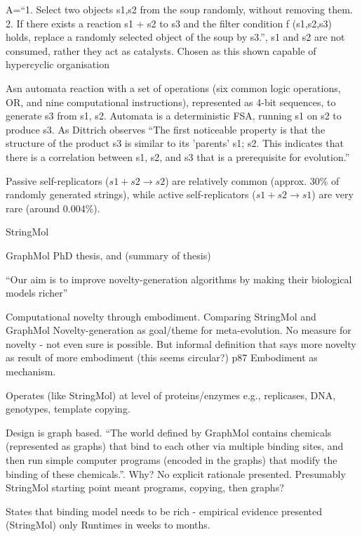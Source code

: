 A=``1. Select two objects s1,s2 from the soup randomly, without removing them. 2. If there exists a reaction s1 + s2 to s3 and the filter condition f (s1,s2,s3) holds, replace a randomly selected object of the soup by s3.'', s1 and s2 are not consumed, rather they act as catalysts. Chosen as this shown capable of hypercyclic organisation

Asn automata reaction with a set of operations (six common logic operations, \eg OR, and nine computational instructions), represented as 4-bit sequences, to generate s3 from s1, s2. Automata is a deterministic FSA, running s1 on s2 to produce s3. As Dittrich observes ``The first noticeable property is that the structure of the product s3 is similar to its 'parents' s1; s2. This indicates that there is a correlation between s1, s2, and s3 that is a prerequisite for evolution.''

Passive self-replicators ($s1 + s2 \rightarrow s2$) are relatively common (approx. 30\% of randomly generated strings), while active self-replicators ($s1 + s2 \rightarrow s1$) are very rare (around 0.004\%).

StringMol \parencite{Hickinbotham2011}



GraphMol \parencite{Nellis2012} PhD thesis, and \parencite{Nellis2014} (summary of thesis)

``Our aim is to improve novelty-generation algorithms by making their biological models richer''

Computational novelty through embodiment. Comparing StringMol and GraphMol
Novelty-generation as goal/theme for meta-evolution. No measure for novelty - not even sure is possible. But informal definition that says more novelty as result of more embodiment (this seems circular?) p87 Embodiment as mechanism. 

Operates (like StringMol) at level of proteins/enzymes e.g., replicases, DNA, genotypes, template copying.

Design is graph based. ``The world defined by GraphMol contains chemicals (represented as graphs) that bind to each other via multiple binding sites, and then run simple computer programs (encoded in the graphs) that modify the binding of these chemicals.''. Why? No explicit rationale presented. Presumably StringMol starting point meant programs, copying, then graphs? 

States that binding model needs to be rich - empirical evidence presented (StringMol) only
Runtimes in weeks to months.

